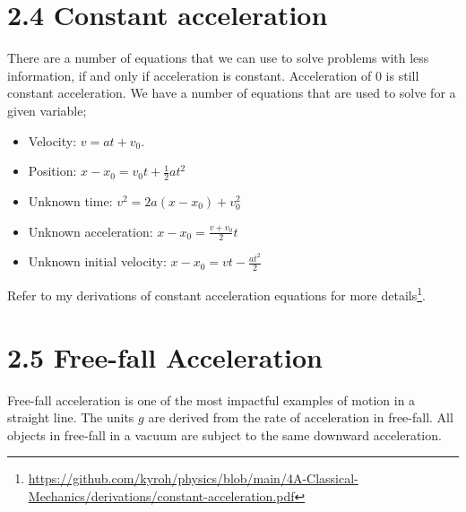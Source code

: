 \documentclass{article}
\begin{document}
\section*{2.4 Constant acceleration}
There are a number of equations that we can use to solve problems with less information, if and only if acceleration is constant.
Acceleration of 0 is still constant acceleration.
We have a number of equations that are used to solve for a given variable;
\begin{itemize}
	\item Velocity: $v = at + v_0$.
	\item Position: $x-x_0 = v_0t + \frac{1}{2} at^2$
	\item Unknown time: $v^2 = 2a \left( x - x_0 \right) + v_0^2$
	\item Unknown acceleration: $x - x_0 = \frac{v + v_0}{2} t$
	\item Unknown initial velocity: $x - x_0 = v t - \frac{at^2}{2}$
\end{itemize}
Refer to my derivations of constant acceleration equations for more details\footnote{\href{https://github.com/kyroh/physics/blob/main/4A-Classical-Mechanics/derivations/constant-acceleration.pdf}{https://github.com/kyroh/physics/blob/main/4A-Classical-Mechanics/derivations/constant-acceleration.pdf}}.

\section*{2.5 Free-fall Acceleration}
Free-fall acceleration is one of the most impactful examples of motion in a straight line.
The units $g$ are derived from the rate of acceleration in free-fall.
All objects in free-fall in a vacuum are subject to the same downward acceleration.
\end{document}
